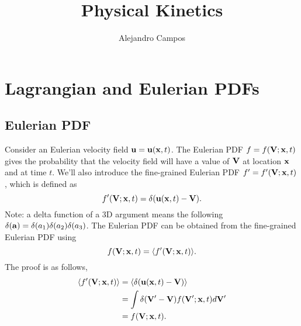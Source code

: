 \documentclass[a4paper,11pt]{report}
\title{Physical Kinetics}
\author{Alejandro Campos}
\begin{document}
\maketitle
\tableofcontents

\appendix

\chapter{Lagrangian and Eulerian PDFs}

\section{Eulerian PDF}
Consider an Eulerian velocity field $\mathbf{u} = \mathbf{u}(\mathbf{x},t)$. The Eulerian PDF $f = f(\mathbf{V}; \mathbf{x},t)$ gives the probability that the velocity field will have a value of $\mathbf{V}$ at location $\mathbf{x}$ and at time $t$. We'll also introduce the fine-grained Eulerian PDF $f' = f'(\mathbf{V};\mathbf{x},t)$, which is defined as 
\begin{equation}
    f'(\mathbf{V}; \mathbf{x}, t) = \delta(\mathbf{u}(\mathbf{x},t) - \mathbf{V}).
\end{equation}
Note: a delta function of a 3D argument means the following $\delta(\mathbf{a}) = \delta(a_1) \delta(a_2) \delta(a_3) $. The Eulerian PDF can be obtained from the fine-grained Eulerian PDF using 
\begin{equation}
    \label{eq:fine_eul_pdf}
    f(\mathbf{V}; \mathbf{x}, t)=\langle f'(\mathbf{V}; \mathbf{x}, t) \rangle.
\end{equation}
The proof is as follows,
\begin{align}
    \langle f'(\mathbf{V}; \mathbf{x}, t) \rangle &= \langle \delta( \mathbf{u}(\mathbf{x},t) - \mathbf{V}) \rangle \nonumber \\
    &= \int \delta( \mathbf{V}' - \mathbf{V}) f(\mathbf{V}';\mathbf{x},t) d\mathbf{V}' \nonumber \\
    &= f(\mathbf{V}; \mathbf{x}, t).
\end{align}

\end{document}

